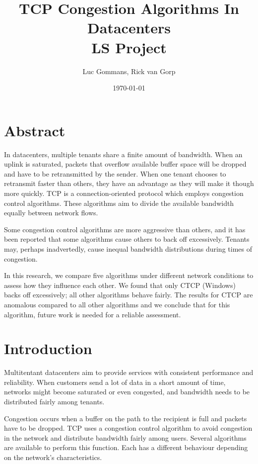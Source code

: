 \documentclass{article}
\title{TCP Congestion Algorithms In Datacenters \\
	\vspace{0.3cm}
	{\large LS Project}
}
\date{\today{}}
\author{Luc Gommans, Rick van Gorp}
\begin{document}
\maketitle

\section{Abstract}

In datacenters, multiple tenants share a finite amount of bandwidth. When an
uplink is saturated, packets that overflow available buffer space will be
dropped and have to be retransmitted by the sender. When one tenant chooses to
retransmit faster than others, they have an advantage as they will make it
though more quickly. TCP is a connection-oriented protocol which employs
congestion control algorithms. These algorithms aim to divide the available
bandwidth equally between network flows.

Some congestion control algorithms are more aggressive than others, and it has
been reported that some algorithms cause others to back off excessively.
Tenants may, perhaps inadvertedly, cause inequal bandwidth distributions during
times of congestion.

In this research, we compare five algorithms under different network conditions
to assess how they influence each other. We found that only CTCP (Windows)
backs off excessively; all other algorithms behave fairly. The results for CTCP
are anomalous compared to all other algorithms and we conclude that for this
algorithm, future work is needed for a reliable assessment.


\section{Introduction}

Multitentant datacenters aim to provide services with consistent performance
and reliability. When customers send a lot of data in a short amount of time,
networks might become saturated or even congested, and bandwidth needs to be
distributed fairly among tenants.

Congestion occurs when a buffer on the path to the recipient is full and
packets have to be dropped. TCP uses a congestion control algorithm to avoid
congestion in the network and distribute bandwidth fairly among users. Several
algorithms are available to perform this function. Each has a different behaviour
depending on the network's characteristics.
\end{document}
